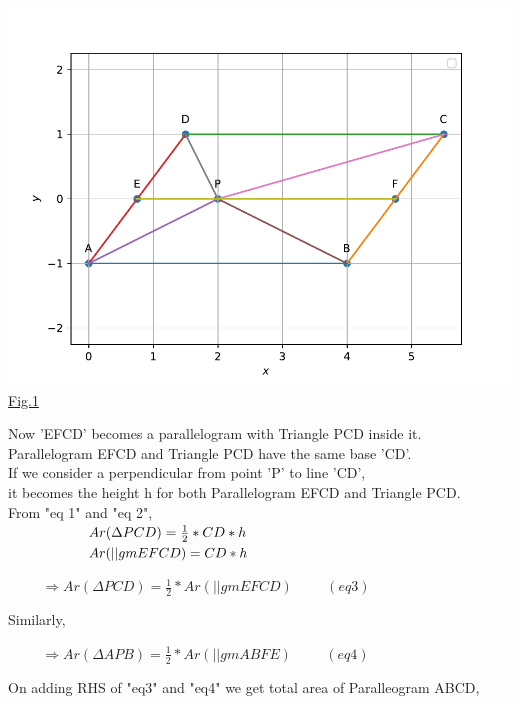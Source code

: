 \documentclass[10pt,a4paper]{report}
\begin{document}
{\begin{multicols}{2}
\vspace{2mm} \centering \includegraphics[scale=0.4]{fig1.pdf} \\ \underline{Fig.1} \\
\raggedright Now 'EFCD' becomes a parallelogram with Triangle PCD inside it. 
\\ Parallelogram EFCD and Triangle PCD have the same base 'CD'.
\\If we consider a perpendicular from point 'P' to line 'CD',
\\it becomes the height h for both Parallelogram EFCD and Triangle PCD.
\\ From "eq 1" and "eq 2", \vspace{1mm}
\\ $\raggedright \hspace{2cm} Ar(\Delta PCD) = \frac{1}{2}*CD*h$
\\ $\raggedright \hspace{2cm} Ar(||gm EFCD) = CD*h$
\\ \raggedright \vspace{2mm} $\hspace{1cm} \Rightarrow Ar(\Delta PCD) = \frac{1}{2}*Ar(||gm EFCD) \hspace{1cm} (eq 3)$ 
\\ \raggedright Similarly, 
\\ \raggedright \vspace{2mm} $\hspace{1cm} \Rightarrow Ar(\Delta APB) = \frac{1}{2}*Ar(||gm ABFE) \hspace{1cm} (eq 4)$
\\ \raggedright On adding RHS of "eq3" and "eq4" we get total area of Paralleogram ABCD, \vspace{3mm}

\end{multicols}}
\end{document}
